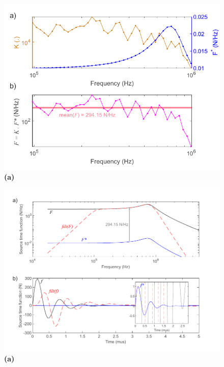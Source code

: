 \documentclass[preprint,3p, 11pt,authoryear]{elsarticle}
\begin{document}
\begin{figure}[ht]
     	\centering
\includegraphics[scale= 1]{FIG8.pdf} 
\caption{\textbf{(a)}  }
	\label{fig8} 
\end{figure}


\begin{figure}[ht]
     	\centering
\includegraphics[scale= 1]{FIG9.pdf} 
\caption{\textbf{(a)}  }
	\label{fig9} 
\end{figure}
\end{document}

